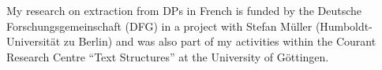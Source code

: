 \documentclass[output=paper]{langsci/langscibook}
\begin{document}
My research on extraction from DPs in French is funded by the Deutsche Forschungsgemeinschaft (DFG) in a project with Stefan Müller (Hum\-boldt-Uni\-ver\-si\-tät zu Berlin) and was also part of my activities within the Courant Research Centre “Text Structures” at the University of Göttingen.
% 
% 
% 
% 
% 
% 
% 
% 
% 
% 
% 
% 
% 
% 
% 
\end{document}
